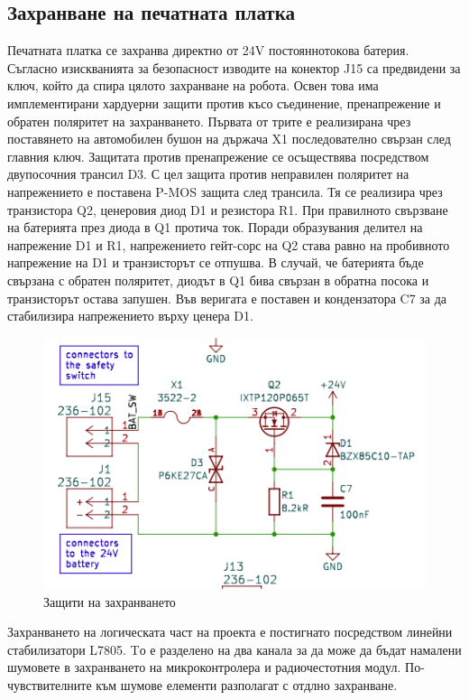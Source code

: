 \subsection{Захранване на печатната платка}

Печатната платка се захранва директно от 24V постояннотокова батерия. Съгласно изискванията за безопасност изводите на конектор J15 са предвидени за ключ, който да спира цялото захранване на робота. Освен това има имплементирани хардуерни защити против късо съединение, пренапрежение и обратен поляритет на захранването. Първата от трите е реализирана чрез поставянето на автомобилен бушон на държача X1 последователно свързан след главния ключ. Защитата против пренапрежение се осъществява посредством двупосочния трансил D3. С цел защита против неправилен поляритет на напрежението е поставена P-MOS защита след трансила. Тя се реализира чрез транзистора Q2, ценеровия диод D1 и резистора R1. При правилното свързване на батерията през диода в Q1 протича ток. Поради образувания делител на напрежение D1 и R1, напрежението гейт-сорс на Q2 става равно на пробивното напрежение на D1 и транзисторът се отпушва. В случай, че батерията бъде свързана с обратен поляритет, диодът в Q1 бива свързан в обратна посока и транзисторът остава запушен. Във веригата е поставен и кондензатора C7 за да стабилизира напрежението върху ценера D1.

\begin{figure}[H]
    \centering
    \includegraphics[width=0.6\linewidth]{images/power-protection.png}
    
    \caption{Защити на захранването}
    \label{fig:power-protection} 
\end{figure}

Захранването на логическата част на проекта е постигнато посредством линейни стабилизатори L7805. Tо е разделено на два канала за да може да бъдат намалени шумовете в захранването на микроконтролера и радиочестотния модул. По-чувствителните към шумове елементи разполагат с отдлно захранване. 

